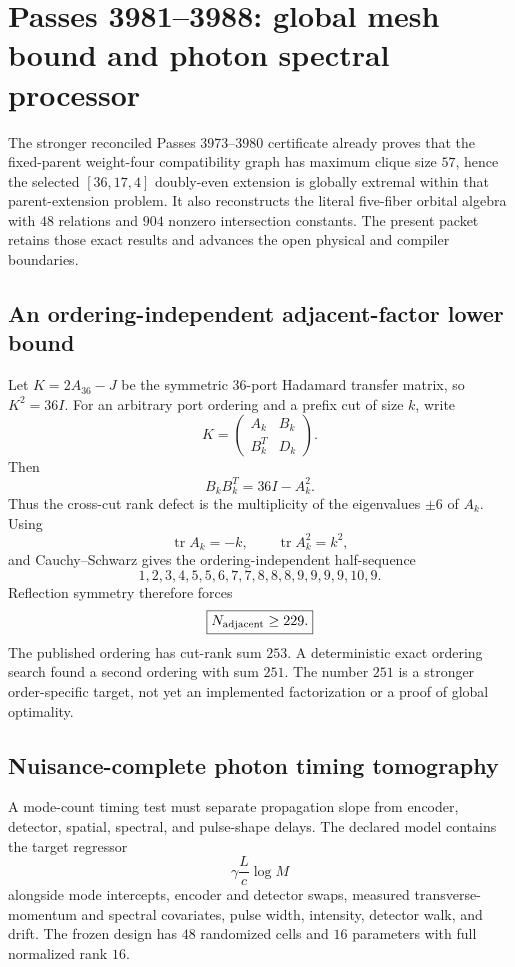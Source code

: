 \section{Passes 3981--3988: global mesh bound and photon spectral processor}
\label{sec:pass3981-3988}

The stronger reconciled Passes 3973--3980 certificate already proves that the fixed-parent weight-four compatibility graph has maximum clique size $57$, hence the selected $[36,17,4]$ doubly-even extension is globally extremal within that parent-extension problem.  It also reconstructs the literal five-fiber orbital algebra with $48$ relations and $904$ nonzero intersection constants.  The present packet retains those exact results and advances the open physical and compiler boundaries.

\subsection{An ordering-independent adjacent-factor lower bound}

Let $K=2A_{36}-J$ be the symmetric $36$-port Hadamard transfer matrix, so $K^2=36I$.  For an arbitrary port ordering and a prefix cut of size $k$, write
\[
K=\begin{pmatrix}A_k&B_k\\B_k^T&D_k\end{pmatrix}.
\]
Then
\[
B_kB_k^T=36I-A_k^2.
\]
Thus the cross-cut rank defect is the multiplicity of the eigenvalues $\pm6$ of $A_k$.  Using
\[
\operatorname{tr}A_k=-k,
\qquad
\operatorname{tr}A_k^2=k^2,
\]
and Cauchy--Schwarz gives the ordering-independent half-sequence
\[
1,2,3,4,5,5,6,7,7,8,8,8,9,9,9,9,10,9.
\]
Reflection symmetry therefore forces
\[
\boxed{N_{\rm adjacent}\ge229.}
\]
The published ordering has cut-rank sum $253$.  A deterministic exact ordering search found a second ordering with sum $251$.  The number $251$ is a stronger order-specific target, not yet an implemented factorization or a proof of global optimality.

\subsection{Nuisance-complete photon timing tomography}

A mode-count timing test must separate propagation slope from encoder, detector, spatial, spectral, and pulse-shape delays.  The declared model contains the target regressor
\[
\gamma\frac{L}{c}\log M
\]
alongside mode intercepts, encoder and detector swaps, measured transverse-momentum and spectral covariates, pulse width, intensity, detector walk, and drift.  The frozen design has $48$ randomized cells and $16$ parameters with full normalized rank $16$.

